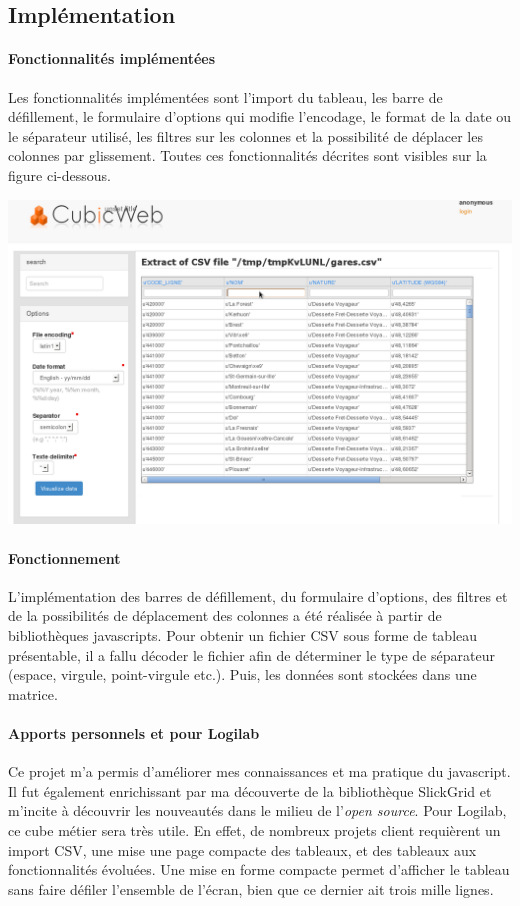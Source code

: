 \documentclass {report}
\begin{document}
\subsection{Implémentation}

\paragraph{Fonctionnalités implémentées} Les fonctionnalités implémentées sont l'import du tableau, les barre de défillement, le formulaire d'options qui modifie l'encodage, le format de la date ou le séparateur utilisé, les filtres sur les colonnes et la possibilité de déplacer les colonnes par glissement. Toutes ces fonctionnalités décrites sont visibles sur la figure ci-dessous.


\begin{center}
\includegraphics[scale=0.5]{slick.png}
\end{center}

\paragraph{Fonctionnement}
L'implémentation des barres de défillement, du formulaire d'options, des filtres et de la possibilités de déplacement des colonnes a été réalisée à partir de bibliothèques javascripts. Pour obtenir un fichier CSV sous forme de tableau présentable, il a fallu décoder le fichier afin de déterminer le type de séparateur (espace, virgule, point-virgule etc.). Puis, les données sont stockées dans une matrice.

\paragraph{Apports personnels et pour Logilab}
Ce projet m'a permis d'améliorer mes connaissances et ma pratique du javascript\footnotemark[1]. Il fut également enrichissant par ma découverte de la bibliothèque SlickGrid et m'incite à découvrir les nouveautés dans le milieu de l'\textit{open source}. Pour Logilab, ce cube métier sera très utile. En effet, de nombreux projets client requièrent un import CSV, une mise une page compacte des tableaux, et des tableaux aux fonctionnalités évoluées. Une mise en forme compacte permet d'afficher le tableau sans faire défiler l'ensemble de l'écran, bien que ce dernier ait trois mille lignes.
\end{document}
